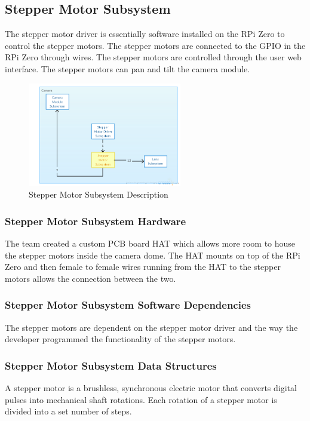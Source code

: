 \subsection{Stepper Motor Subsystem}
The stepper motor driver is essentially software installed on the RPi Zero to control the stepper motors. The stepper motors are connected to the GPIO in the RPi Zero through wires. The stepper motors are controlled through the user web interface. The stepper motors can pan and tilt the camera module. 

\begin{figure}[h!] 
 	\centering 
  	\includegraphics[width=0.60\textwidth]{images/ADSdiagrams/steppermotorsubsystem.png} 
 \caption{Stepper Motor Subsystem Description} 
\end{figure}

\subsubsection{Stepper Motor Subsystem Hardware}
The team created a custom PCB board HAT which allows more room to house the stepper motors inside the camera dome. The HAT mounts on top of the RPi Zero and then female to female wires running from the HAT to the stepper motors allows the connection between the two.


\subsubsection{Stepper Motor Subsystem Software Dependencies}
The stepper motors are dependent on the stepper motor driver and the way the developer programmed the functionality of the stepper motors.


\subsubsection{Stepper Motor Subsystem Data Structures}
A stepper motor is a brushless, synchronous electric motor that converts digital pulses into mechanical shaft rotations. Each rotation of a stepper motor is divided into a set number of steps.



